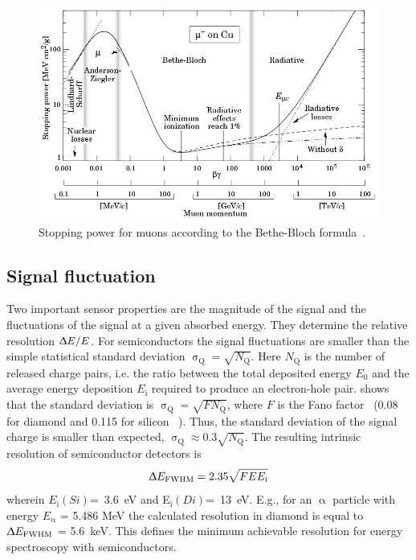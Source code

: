 \begin{figure}[!t]
\begin{center}
\includegraphics[width=0.85\linewidth]{02_pulse_formation/pics/bb2}
\caption{Stopping power for muons according to the Bethe-Bloch formula~\cite{}.}
\label{fig:bb2}
\end{center}
\end{figure}


\subsection{Signal fluctuation}
Two important sensor properties are the magnitude of the signal and the fluctuations of the signal at a given absorbed energy. They determine the relative resolution $\Updelta E/E$. For semiconductors the signal fluctuations are smaller than the simple statistical standard deviation $\upsigma_\mathrm{Q}=\sqrt{N_\mathrm{Q}}$. Here $N_\mathrm{Q}$ is the number of released charge pairs, i.e. the ratio between the total deposited energy $E_\mathrm{0}$ and the average energy deposition $E_\mathrm{i}$ required to produce an electron-hole pair. \cite{} shows that the standard deviation is $\upsigma_\mathrm{Q}=\sqrt{F N_\mathrm{Q}}$, where $F$ is the Fano factor~\cite{} (0.08 for diamond and 0.115 for silicon ~\cite{}). Thus, the standard deviation of the signal charge is smaller than expected, $\upsigma_\mathrm{Q}\approx0.3 \sqrt{N_\mathrm{Q}}$. The resulting intrinsic resolution of semiconductor detectors is 
\begin{equation}
\label{eq:efwhm}
\Updelta E_\mathrm{FWHM} = 2.35 \sqrt{FEE_\mathrm{i}} 
\end{equation} 
wherein $E_\mathrm{i}(Si)$=~3.6~eV and E$_\mathrm{i}(Di)$=~13~eV. E.g., for an $\upalpha$ particle with energy $E_\upalpha$ = 5.486 MeV the calculated resolution in diamond is equal to $\Updelta E_{\mathrm{FWHM}}$ = 5.6~keV. This defines the minimum achievable resolution for energy spectroscopy with semiconductors. 
%



